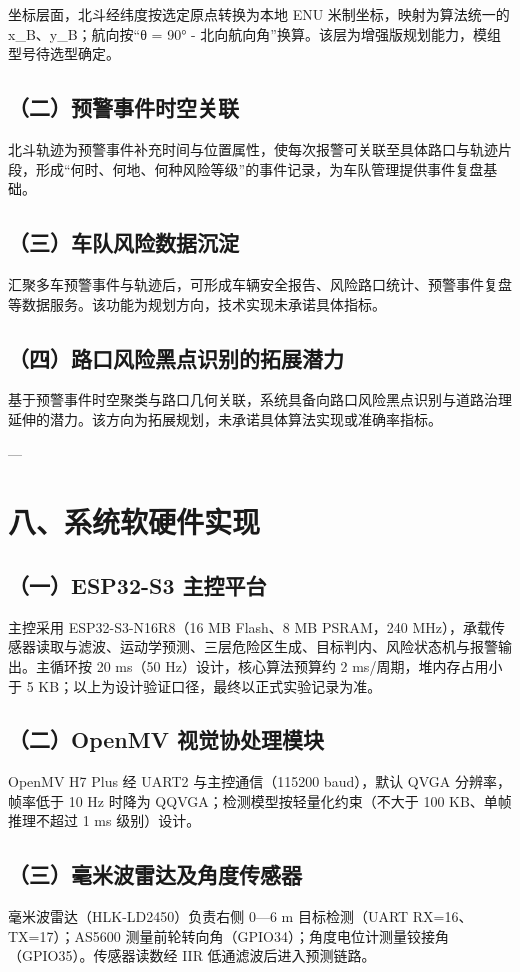 \documentclass[UTF8,11pt]{ctexart}
\begin{document}
坐标层面，北斗经纬度按选定原点转换为本地 ENU 米制坐标，映射为算法统一的 x\_B、y\_B；航向按“θ = 90° - 北向航向角”换算。该层为增强版规划能力，模组型号待选型确定。

\subsection*{（二）预警事件时空关联}
北斗轨迹为预警事件补充时间与位置属性，使每次报警可关联至具体路口与轨迹片段，形成“何时、何地、何种风险等级”的事件记录，为车队管理提供事件复盘基础。

\subsection*{（三）车队风险数据沉淀}
汇聚多车预警事件与轨迹后，可形成车辆安全报告、风险路口统计、预警事件复盘等数据服务。该功能为规划方向，技术实现未承诺具体指标。

\subsection*{（四）路口风险黑点识别的拓展潜力}
基于预警事件时空聚类与路口几何关联，系统具备向路口风险黑点识别与道路治理延伸的潜力。该方向为拓展规划，未承诺具体算法实现或准确率指标。

---

\section*{八、系统软硬件实现}
\subsection*{（一）ESP32-S3 主控平台}
主控采用 ESP32-S3-N16R8（16 MB Flash、8 MB PSRAM，240 MHz），承载传感器读取与滤波、运动学预测、三层危险区生成、目标判内、风险状态机与报警输出。主循环按 20 ms（50 Hz）设计，核心算法预算约 2 ms/周期，堆内存占用小于 5 KB；以上为设计验证口径，最终以正式实验记录为准。

\subsection*{（二）OpenMV 视觉协处理模块}
OpenMV H7 Plus 经 UART2 与主控通信（115200 baud），默认 QVGA 分辨率，帧率低于 10 Hz 时降为 QQVGA；检测模型按轻量化约束（不大于 100 KB、单帧推理不超过 1 ms 级别）设计。

\subsection*{（三）毫米波雷达及角度传感器}
毫米波雷达（HLK-LD2450）负责右侧 0—6 m 目标检测（UART RX=16、TX=17）；AS5600 测量前轮转向角（GPIO34）；角度电位计测量铰接角（GPIO35）。传感器读数经 IIR 低通滤波后进入预测链路。
\end{document}
